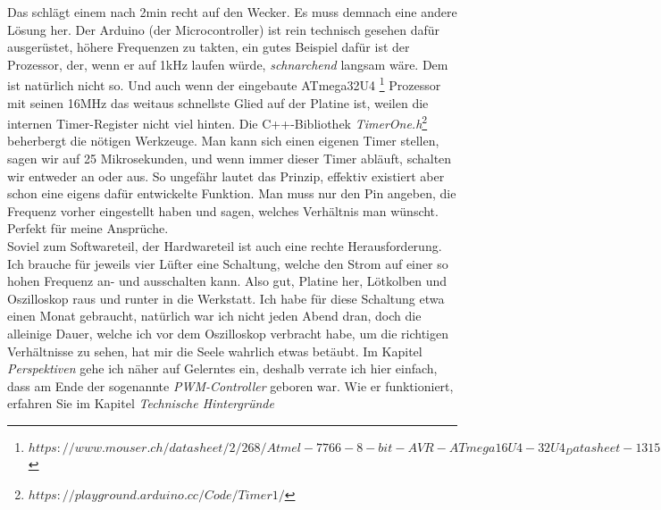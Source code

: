 \documentclass[12pt,titlepage,a4paper]{article}
\begin{document}
Das schlägt einem nach 2min recht auf den Wecker. Es muss demnach eine andere Lösung her. Der Arduino (der Microcontroller) ist rein technisch gesehen dafür ausgerüstet, höhere Frequenzen zu takten, ein gutes Beispiel dafür ist der Prozessor, der, wenn er auf 1kHz laufen würde, \textit{schnarchend} langsam wäre. Dem ist natürlich nicht so. Und auch wenn der eingebaute ATmega32U4
\footnote{$https://www.mouser.ch/datasheet/2/268/Atmel-7766-8-bit-AVR-ATmega16U4-32U4_Datasheet-1315135.pdf$}
Prozessor mit seinen 16MHz das weitaus schnellste Glied auf der Platine ist, weilen die internen Timer-Register nicht viel hinten. Die C++-Bibliothek \textit{TimerOne.h}\footnote{$https://playground.arduino.cc/Code/Timer1/$} beherbergt die nötigen Werkzeuge. Man kann sich einen eigenen Timer stellen, sagen wir auf 25 Mikrosekunden, und wenn immer dieser Timer abläuft, schalten wir entweder an oder aus. So ungefähr lautet das Prinzip, effektiv existiert aber schon eine eigens dafür entwickelte Funktion. Man muss nur den Pin angeben, die Frequenz vorher eingestellt haben und sagen, welches Verhältnis man wünscht. Perfekt für meine Ansprüche. \\
Soviel zum Softwareteil, der Hardwareteil ist auch eine rechte Herausforderung. Ich brauche für jeweils vier Lüfter eine Schaltung, welche den Strom auf einer so hohen Frequenz an- und ausschalten kann. Also gut, Platine her, Lötkolben und Oszilloskop raus und runter in die Werkstatt. Ich habe für diese Schaltung etwa einen Monat gebraucht, natürlich war ich nicht jeden Abend dran, doch die alleinige Dauer, welche ich vor dem Oszilloskop verbracht habe, um die richtigen Verhältnisse zu sehen, hat mir die Seele wahrlich etwas betäubt. Im Kapitel \textit{Perspektiven} gehe ich näher auf Gelerntes ein, deshalb verrate ich hier einfach, dass am Ende der sogenannte \textit{PWM-Controller} geboren war. Wie er funktioniert, erfahren Sie im Kapitel \textit{Technische Hintergründe}
\end{document}
